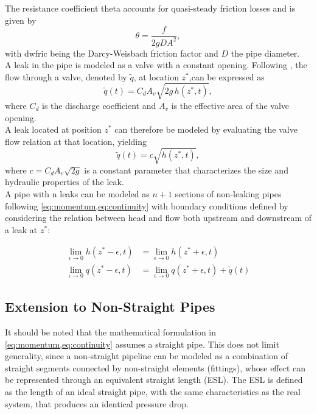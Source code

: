 The resistance coefficient \gls{theta} accounts for quasi-steady friction losses and is given by
\begin{equation}
\label{eq:theta_defined}
\theta = \frac{f}{2 g D A^{2}},
\end{equation}
with \gls{dwfric} being the Darcy-Weisbach friction factor and $D$ the pipe diameter.\\

A leak in the pipe is modeled as a valve with a constant opening. Following \cite[pp.~54]{chaudhry2013}, the flow through a valve, denoted by $\tilde{q}$, at location $z^*$,can be expressed as
\begin{equation*}
\tilde{q}(t) = C_d A_v \sqrt{2 g \, h(z^*,t)},
\end{equation*}
where $C_d$ is the discharge coefficient and $A_v$ is the effective area of the valve opening.  \\

A leak located at position $z^*$ can therefore be modeled by evaluating the valve flow relation at that location, yielding
\begin{equation}
\tilde{q}(t) = c \sqrt{h(z^*,t)},
\label{eq:leak_model}
\end{equation}
where $c = C_d A_v \sqrt{2 g}$ is a constant parameter that characterizes the size and hydraulic properties of the leak.\\

A pipe with \gls{n} leaks can be modeled as $n+1$ sections of non-leaking pipes following \cref{eq:momentum,eq:continuity} with boundary conditions defined by considering the relation between head and flow both upstream and downstream of a leak at $z^*$:

\begin{align}
    \lim_{\epsilon \rightarrow0} h(z^*-\epsilon,t) &= \lim_{\epsilon \rightarrow0} h(z^*+\epsilon,t) \label{eq:head_boundary} \\
    \lim_{\epsilon \rightarrow0} q(z^*-\epsilon,t) &= \lim_{\epsilon \rightarrow0} q(z^*+\epsilon,t) + \tilde{q}(t) \label{eq:flow_boundary}
\end{align}

\subsection*{Extension to Non-Straight Pipes}
It should be noted that the mathematical formulation in \cref{eq:momentum,eq:continuity} assumes a straight pipe. This does not limit generality, since a non-straight pipeline can be modeled as a combination of straight segments connected by non-straight elements (fittings), whose effect can be represented through an equivalent straight length (ESL). The ESL is defined as the length of an ideal straight pipe, with the same characteristics as the real system, that produces an identical pressure drop. \\

